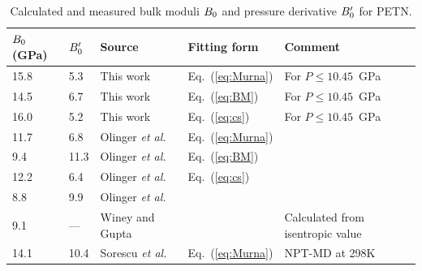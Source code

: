 \documentclass[prb,aps,nobibnotes,superbib,preprint]{revtex4}
\begin{document}
\begin{table}[p]
\begin{center}
\begin{tabular}{lllll}
\hline\hline
$B_0$(GPa) &   ${B'_0}$   &   Source  &    Fitting form &      Comment \\
\hline
15.8 & 5.3 & This work &  Eq.~(\ref{eq:Murna}) & For $P \le 10.45$~GPa \\
14.5 & 6.7 & This work & Eq.~(\ref{eq:BM}) & For $P \le 10.45$~GPa \\
16.0 & 5.2 & This work & Eq.~(\ref{eq:cs}) & For $P \le 10.45$~GPa \\
11.7 & 6.8 & Olinger {\it et al.}~\cite{Olinger_1975v62} & Eq.~(\ref{eq:Murna}) \\
9.4 & 11.3 & Olinger {\it et al.}~\cite{Olinger_1975v62} & Eq.~(\ref{eq:BM}) \\
12.2 & 6.4 & Olinger {\it et al.}~\cite{Olinger_1975v62} & Eq.~(\ref{eq:cs}) \\
8.8 & 9.9 &   Olinger {\it et al.}~\cite{Olinger_1976}&   &                  \\
 9.1 & --- &   Winey and Gupta~\cite{Winey_2001v90} &     & Calculated from isentropic value \\
14.1 &10.4 &Sorescu {\it et al.}~\cite{Sorescu_1999v103} & Eq.~(\ref{eq:Murna})&         NPT-MD at 298K\\
\hline\hline
\end{tabular}
\end{center}
\caption{Calculated and measured bulk moduli $B_0$ and pressure
derivative ${B'_0}$ for PETN.
}
\label{tab:table3}
\end{table}
\end{document}
